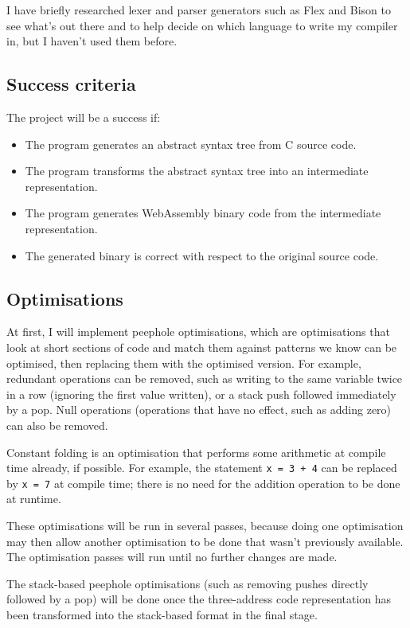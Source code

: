 I have briefly researched lexer and parser generators such as Flex and Bison to see what's out there and to help decide on which language to write my compiler in, but I haven't used them before.

\subsection*{Success criteria}

The project will be a success if:

\begin{itemize}
\item The program generates an abstract syntax tree from C source code.
\item The program transforms the abstract syntax tree into an intermediate representation.
\item The program generates WebAssembly binary code from the intermediate representation.
\item The generated binary is correct with respect to the original source code.
\end{itemize}


\subsection*{Optimisations}

At first, I will implement peephole optimisations, which are optimisations that look at short sections of code and match them against patterns we know can be optimised, then replacing them with the optimised version.
For example, redundant operations can be removed, such as writing to the same variable twice in a row (ignoring the first value written), or a stack push followed immediately by a pop.
Null operations (operations that have no effect, such as adding zero) can also be removed.

Constant folding is an optimisation that performs some arithmetic at compile time already, if possible. For example, the statement \texttt{x = 3 + 4} can be replaced by \texttt{x = 7} at compile time; there is no need for the addition operation to be done at runtime.

These optimisations will be run in several passes, because doing one optimisation may then allow another optimisation to be done that wasn't previously available. The optimisation passes will run until no further changes are made.

The stack-based peephole optimisations (such as removing pushes directly followed by a pop) will be done once the three-address code representation has been transformed into the stack-based format in the final stage.

